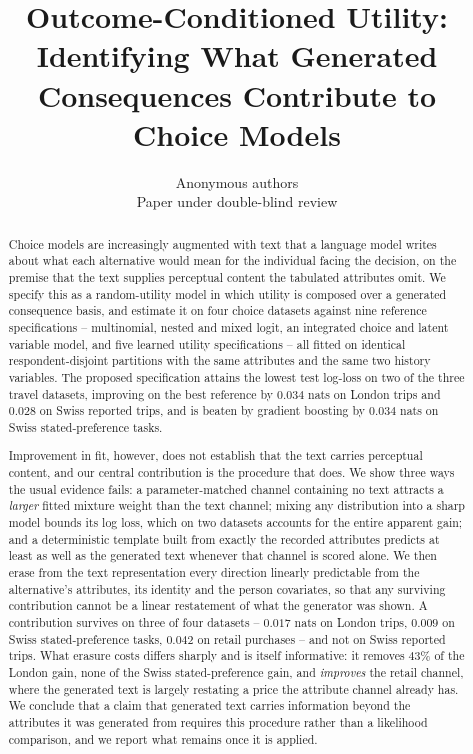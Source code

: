 \documentclass{article}
\title{Outcome-Conditioned Utility:\\Identifying What Generated Consequences Contribute to Choice Models}
\author{Anonymous authors\\Paper under double-blind review}
\begin{document}
\maketitle

\begin{abstract}
Choice models are increasingly augmented with text that a language model writes about what
each alternative would mean for the individual facing the decision, on the premise that the
text supplies perceptual content the tabulated attributes omit. We specify this as a
random-utility model in which utility is composed over a generated consequence basis, and
estimate it on four choice datasets against nine reference specifications -- multinomial,
nested and mixed logit, an integrated choice and latent variable model, and five learned
utility specifications -- all fitted on identical respondent-disjoint partitions with the
same attributes and the same two history variables. The proposed specification attains the
lowest test log-loss on two of the three travel datasets, improving on the best reference by
$0.034$ nats on London trips and $0.028$ on Swiss reported trips, and is beaten by gradient
boosting by $0.034$ nats on Swiss stated-preference tasks.

Improvement in fit, however, does not establish that the text carries perceptual content, and
our central contribution is the procedure that does. We show three ways the usual evidence
fails: a parameter-matched channel containing no text attracts a \emph{larger} fitted mixture
weight than the text channel; mixing any distribution into a sharp model bounds its log loss,
which on two datasets accounts for the entire apparent gain; and a deterministic template
built from exactly the recorded attributes predicts at least as well as the generated text
whenever that channel is scored alone. We then erase from the text representation every
direction linearly predictable from the alternative's attributes, its identity and the person
covariates, so that any surviving contribution cannot be a linear restatement of what the
generator was shown. A contribution survives on three of four datasets -- $0.017$ nats on
London trips, $0.009$ on Swiss stated-preference tasks, $0.042$ on retail purchases -- and not
on Swiss reported trips. What erasure costs differs sharply and is itself informative: it
removes $43\%$ of the London gain, none of the Swiss stated-preference gain, and
\emph{improves} the retail channel, where the generated text is largely restating a price the
attribute channel already has. We conclude that a claim that generated text carries
information beyond the attributes it was generated from requires this procedure rather than a
likelihood comparison, and we report what remains once it is applied.
\end{abstract}













\appendix

\end{document}
